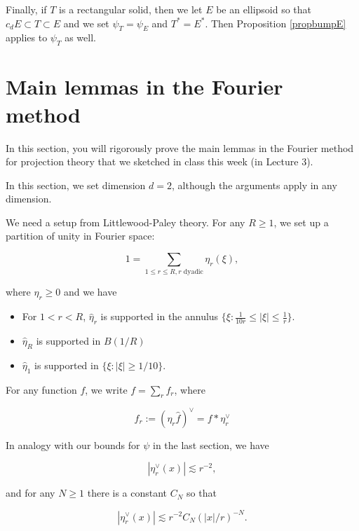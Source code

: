 \documentclass{amsart}
\begin{document}
Finally,  if $T$ is a rectangular solid,  then we let $E$ be an ellipsoid so that $c_d E \subset T \subset E$ and we set $\psi_T = \psi_E$ and $T^* = E^*$.  Then Proposition \ref{propbumpE} applies to $\psi_T$ as well.

\section{Main lemmas in the Fourier method}

In this section,  you will rigorously prove the main lemmas in the Fourier method for projection theory that we sketched in class this week (in Lecture 3).

In this section,  we set dimension $d=2$,  although the arguments apply in any dimension.

We need a setup from Littlewood-Paley theory.   For any $R \ge 1$,  we set up a partition of unity in Fourier space:

$$1 = \sum_{1 \le r \le R,  r \textrm{ dyadic}} \eta_r(\xi), $$

\noindent where $\eta_r \ge 0$ and we have

\begin{itemize}

\item For $1 < r < R$,   $\hat \eta_r$ is supported in the annulus $\{ \xi: \frac{1}{10r} \le |\xi| \le \frac{1}{r} \}$.

\item $\hat \eta_R$ is supported in $B(1/R)$

\item $\hat \eta_1$ is supported in $\{ \xi: |\xi| \ge 1/10 \}$.

\end{itemize}

For any function $f$,  we write $f = \sum_r f_r$,  where 

\begin{equation} \label{deffr}
f_r := \left( \eta_r \hat f \right)^\vee = f * \eta_r^\vee
\end{equation}

In analogy with our bounds for $\psi$ in the last section,  we have

\begin{equation} \label{etavee1}
 |\eta_r^\vee(x)| \lesssim r^{-2},  
\end{equation}

and for any $N \ge 1$ there is a constant $C_N$ so that

\begin{equation} \label{etavee2}
 |\eta_r^\vee(x)| \lesssim r^{-2} C_N (|x|/r)^{-N}.
\end{equation}
\end{document}
